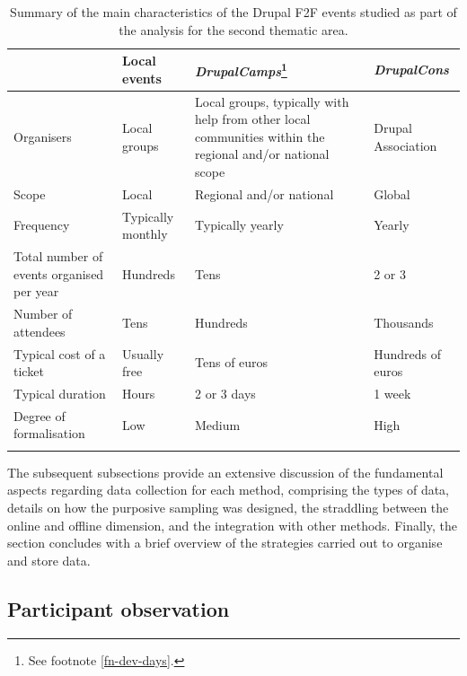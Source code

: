     \begin{footnotesize}
    \begin{longtable}{p{3cm}|p{3cm}|p{3cm}|p{3cm}|}
    \cline{2-4}
& Local events      & \textit{DrupalCamps}\footnote{See footnote \ref{fn-dev-days}.} & \textit{DrupalCons}         \\ \hline \hline
\multicolumn{1}{|p{3cm}||}{Organisers} & Local groups & Local groups, typically with help from other local communities within the regional and/or national scope & Drupal Association \\ \hline
\multicolumn{1}{|p{3cm}||}{Scope} & Local             & Regional and/or national & Global        \\ \hline
\multicolumn{1}{|p{3cm}||}{Frequency} & Typically monthly & Typically yearly & Yearly             \\ \hline
    \multicolumn{1}{|p{3cm}||}{Total number of events organised per year} & Hundreds          & Tens & 2 or 3             \\ \hline
    \multicolumn{1}{|p{3cm}||}{Number of attendees} & Tens            & Hundreds & Thousands          \\ \hline
    \multicolumn{1}{|p{3cm}||}{Typical cost of a ticket} & Usually free      & Tens of euros & Hundreds of euros  \\ \hline
    \multicolumn{1}{|p{3cm}||}{Typical duration} & Hours             & 2 or 3 days & 1 week             \\ \hline
    \multicolumn{1}{|p{3cm}||}{Degree of formalisation} & Low               & Medium & High               \\ \hline
    \caption[Summary of the main characteristics of the Drupal F2F events studied]{Summary of the main characteristics of the Drupal F2F events studied as part of the analysis for the second thematic area.}
    \label{f2f-events-chars}
    \end{longtable}
    \end{footnotesize}

The subsequent subsections provide an extensive discussion of the fundamental aspects regarding data collection for each method, comprising the types of data, details on how the purposive sampling was designed, the straddling between the online and offline dimension, and the integration with other methods. Finally, the section concludes with a brief overview of the strategies carried out to organise and store data.

\subsection{Participant observation}
\label{subsec:participant-observation}

